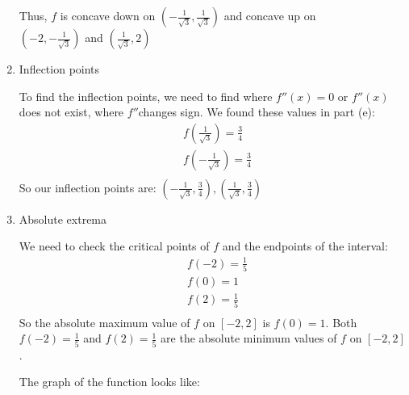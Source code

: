 \documentclass[nooutcomes]{ximera}
\begin{document}
\begin{problem}
\begin{enumerate}
\begin{freeResponse}
\begin{center}
\begin{image}
\begin{tikzpicture}
\end{tikzpicture}
\end{image}
\end{center}


		
		
		Thus, $f$ is concave down on $\left( - \frac{1}{\sqrt{3}}, \frac{1}{\sqrt{3}} \right)$ and concave up on \\ 
		$\left( -2, - \frac{1}{\sqrt{3}} \right)$ and $\left( \frac{1}{\sqrt{3}}, 2 \right)$
		\end{freeResponse}
	\item  Inflection points
	
		\begin{freeResponse}
		To find the inflection points, we need to find where $f''(x)=0$ or $f''(x)$ does not exist,  where $f''$changes sign.  We found these values in part (e):
		\begin{align*}
 		 & f\left( \frac{1}{\sqrt{3}} \right)=\frac{3}{4} \\ 
 		& f\left( -\frac{1}{\sqrt{3}} \right)=\frac{3}{4} \\ 
		\end{align*}  
		So our inflection points are: $\left( -\frac{1}{\sqrt{3}},\frac{3}{4} \right),\left( \frac{1}{\sqrt{3}},\frac{3}{4} \right)$
		\end{freeResponse}
	\item  Absolute extrema
	
		\begin{freeResponse}
		We need to check the critical points of $f$ and the endpoints of the interval:
		\begin{align*}
  		& f(-2)=\frac{1}{5} \\ 
 		& f(0)=1 \\ 
 		& f(2)=\frac{1}{5} \\ 
		\end{align*}
		So the absolute maximum value of $f$ on $[-2,2]$ is $f(0)=1$.  Both $f(-2)=\frac{1}{5}$ and $f(2)=\frac{1}{5}$ are the absolute minimum values of $f$ on $[-2,2]$.
		
		The graph of the function looks like:
		
\begin{center}
\begin{image}
\begin{tikzpicture}[xscale=2,yscale=2]


\end{tikzpicture}
\end{image}
\end{center}
\end{freeResponse}
\end{enumerate}
\end{problem}
\end{document}
